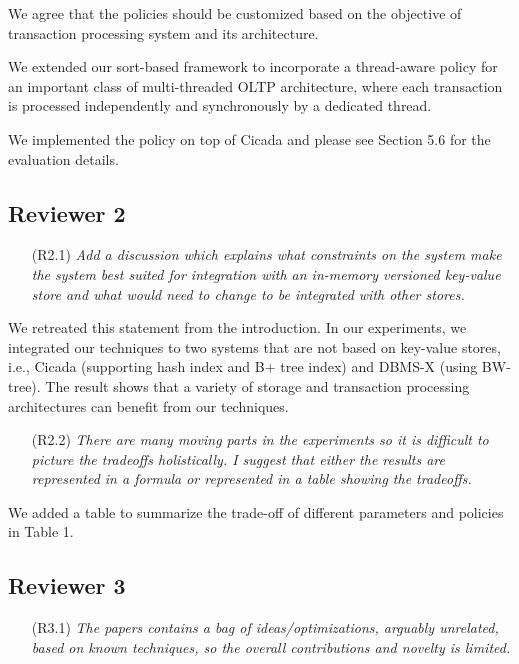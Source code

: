 \documentclass{article}
\newcommand{\todo}[1]{}
\newcommand{\changed}[1]{#1}
\newcommand{\todo}[1]{\textcolor{red}{\bf [TODO!: #1]}}
\newcommand{\changed}[1]{{\color{blue}#1}}
\begin{document}
\changed{
We agree that the policies should be customized based on the objective of transaction processing system and its architecture.

We extended our sort-based framework to incorporate a thread-aware policy for an important class of multi-threaded OLTP architecture, where each transaction is processed independently and synchronously by a dedicated thread.

We implemented the policy on top of Cicada and please see Section 5.6 for the evaluation details.
}

\subsection{Reviewer 2}

\begin{itemize}
\item[(R2.1)] \emph{Add a discussion which explains what constraints on the system make the system best suited for integration with an in-memory versioned key-value store and what would need to change to be integrated with other stores.}
\end{itemize}

\changed{
	We retreated this statement from the introduction. In our experiments, we integrated our techniques to two systems that are not based on key-value stores, i.e., Cicada (supporting hash index and B+ tree index) and DBMS-X (using BW-tree). The result shows that a variety of storage and transaction processing architectures can benefit from our techniques.
}

\begin{itemize}
\item[(R2.2)] \emph{There are many moving parts in the experiments so it is difficult to picture the tradeoffs holistically. I suggest that either the results are represented in a formula or represented in a table showing the tradeoffs.}
\end{itemize}

\todo{Add to appendix}
\changed{
	We added a table to summarize the trade-off of different parameters and policies in Table 1.
}

\subsection{Reviewer 3}

\begin{itemize}
\item[(R3.1)] \emph{The papers contains a bag of ideas/optimizations, arguably unrelated,
	based on known techniques, so the overall contributions and novelty is
	limited.}
\end{itemize}
\end{document}
